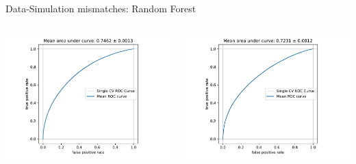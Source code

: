 \begin{frame}[t]{Data-Simulation mismatches: Random Forest}
\begin{columns}[onlytextwidth]
    \begin{column}{0.5\textwidth}
        \includegraphics[width=\textwidth,page=4]{fig/data_mc_separation_DBSCAN.pdf}
    \end{column}
    \begin{column}{0.5\textwidth}
        \includegraphics[width=\textwidth,page=4]{fig/data_mc_separation_thresholds.pdf}
    \end{column}
\end{columns}
\end{frame}

